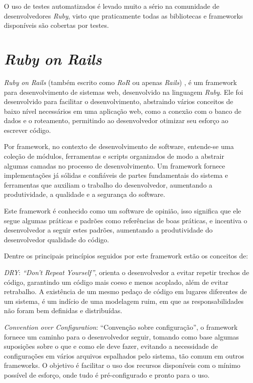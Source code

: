 O uso de testes automatizados é levado muito a sério na comunidade de desenvolvedores \textit{Ruby}, visto que praticamente todas as bibliotecas e frameworks disponíveis são cobertas por testes.




\section{\textit{Ruby on Rails}}

\textit{Ruby on Rails} (também escrito como \textit{RoR} ou apenas \textit{Rails}) \cite{RAILS}, é um framework para desenvolvimento de sistemas web, desenvolvido na linguagem \textit{Ruby}. Ele foi desenvolvido para facilitar o desenvolvimento, abstraindo vários conceitos de baixo nível necessários em uma aplicação web, como a conexão com o banco de dados e o roteamento, permitindo ao desenvolvedor otimizar seu esforço ao escrever código.

Por framework, no contexto de desenvolvimento de software, entende-se uma coleção de módulos, ferramentas e scripts organizados de modo a abstrair algumas camadas no processo de desenvolvimento. Um framework fornece implementações já sólidas e confiáveis de partes fundamentais do sistema e ferramentas que auxiliam o trabalho do desenvolvedor, aumentando a produtividade, a qualidade e a segurança do software.

Este framework é conhecido como um software de opinião, isso significa que ele segue algumas práticas e padrões como referências de boas práticas, e incentiva o desenvolvedor a seguir estes padrões, aumentando a produtividade do desenvolvedor qualidade do código.

Dentre os principais princípios \cite{HANSSON} seguidos por este framework estão os conceitos de:

\textit{DRY}: \textit{“Don’t Repeat Yourself”}, orienta o desenvolvedor a evitar repetir trechos de código, garantindo um código mais coeso e menos acoplado, além de evitar retrabalho. A existência de um mesmo pedaço de código em lugares diferentes de um sistema, é um indício de uma modelagem ruim, em que as responsabilidades não foram bem definidas e distribuídas.

\textit{Convention over Configuration}: “Convenção sobre configuração”, o framework fornece um caminho para o desenvolvedor seguir, tomando como base algumas suposições sobre o que e como ele deve fazer, evitando a necessidade de configurações em vários arquivos espalhados pelo sistema, tão comum em outros frameworks. O objetivo é facilitar o uso dos recursos disponíveis com o mínimo possível de esforço, onde tudo é pré-configurado e pronto para o uso.

